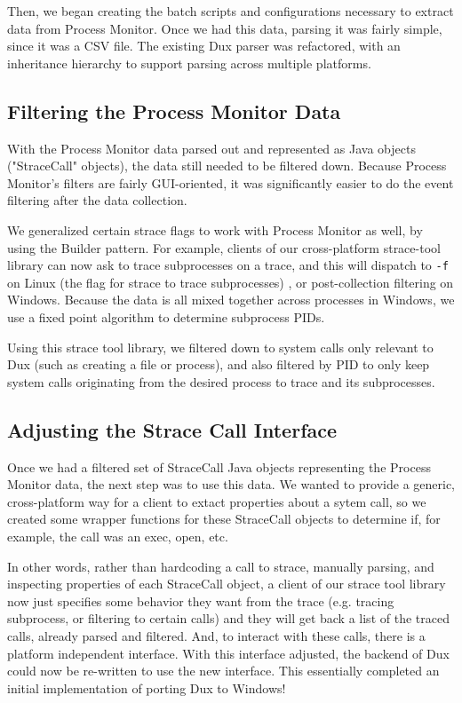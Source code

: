 \documentclass[10pt,conference]{IEEEtran}
\begin{document}
Then, we began creating the batch scripts and configurations necessary to
extract data from Process Monitor. Once we had this data, parsing it was 
fairly simple, since it was a CSV file. The existing Dux parser was refactored, with
an inheritance hierarchy to support parsing across multiple platforms.

\subsection{Filtering the Process Monitor Data}

With the Process Monitor data parsed out and represented as Java objects ("StraceCall"
objects), the data still needed to be filtered down. Because Process Monitor's filters
are fairly GUI-oriented, it was significantly easier to do the event filtering
after the data collection.

We generalized certain strace flags to work with Process Monitor as well, by using
the Builder pattern. For example, clients of our cross-platform strace-tool library
can now ask to trace subprocesses on a trace, and this will dispatch to \texttt{-f} on
Linux (the flag for strace to trace subprocesses) , or post-collection filtering
on Windows. Because the data is all mixed together across processes in Windows,
we use a fixed point algorithm to determine subprocess PIDs.

Using this strace tool library, we filtered down to system calls
only relevant to Dux (such as creating a file or process), and also
filtered by PID to only keep system calls originating from the desired process
to trace and its subprocesses. 

\subsection{Adjusting the Strace Call Interface}

Once we had a filtered set of StraceCall Java objects representing the Process
Monitor data, the next step was to use this data. We wanted to provide a generic,
cross-platform way for a client to extact properties about a sytem call, so we
created some wrapper functions for these StraceCall objects to determine if,
for example, the call was an exec, open, etc.

In other words, rather than hardcoding a call to strace, manually parsing, 
and inspecting properties of each StraceCall object, a client of our strace tool
library now just specifies some behavior they want from the trace
(e.g. tracing subprocess, or filtering to certain calls) and they will get back a list
of the traced calls, already parsed and filtered. And, to interact with these calls,
there is a platform independent interface. With this interface adjusted, the
backend of Dux could now be re-written to use the new interface. This essentially
completed an initial implementation of porting Dux to Windows!
\end{document}
